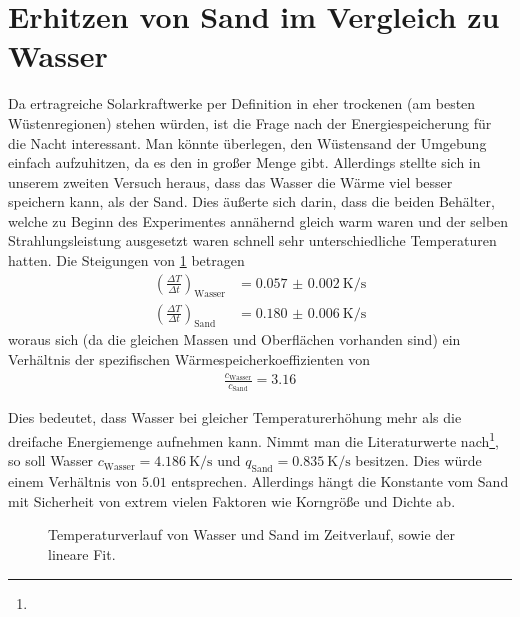 \documentclass[12pt,a4paper,titlepage,headinclude,bibtotoc]{scrartcl}
\begin{document}
\section{Erhitzen von Sand im Vergleich zu Wasser}
Da ertragreiche Solarkraftwerke per Definition in eher trockenen (am besten Wüstenregionen) stehen würden, ist die Frage nach der Energiespeicherung für die Nacht interessant.
Man könnte überlegen, den Wüstensand der Umgebung einfach aufzuhitzen, da es den in großer Menge gibt.
Allerdings stellte sich in unserem zweiten Versuch heraus, dass das Wasser die Wärme viel besser speichern kann, als der Sand.
Dies äußerte sich darin, dass die beiden Behälter, welche zu Beginn des Experimentes annähernd gleich warm waren und der selben Strahlungsleistung ausgesetzt waren schnell sehr unterschiedliche Temperaturen hatten.
Die Steigungen von \ref{fig:wassersand} betragen
\begin{align*}
	\left( \frac{\Delta T}{\Delta t} \right)_\text{Wasser}&=\SI{0.057(2)}{\kelvin \per \second}\\
	\left( \frac{\Delta T}{\Delta t} \right)_\text{Sand}&=\SI{0.180(6)}{\kelvin \per \second}
\end{align*}
woraus sich (da die gleichen Massen und Oberflächen vorhanden sind) ein Verhältnis der spezifischen Wärmespeicherkoeffizienten von
\begin{align*}
	\frac{c_\text{Wasser}}{c_\text{Sand}}=3.16
\end{align*}

Dies bedeutet, dass Wasser bei gleicher Temperaturerhöhung mehr als die dreifache Energiemenge aufnehmen kann.
Nimmt man die Literaturwerte nach\footnote{\spezWaerme}, so soll Wasser $c_\text{Wasser}=\SI{4.186}{\kelvin \per \second}$ und $q_\text{Sand}=\SI{0.835}{\kelvin \per \second}$ besitzen.
Dies würde einem Verhältnis von $5.01$ entsprechen.
Allerdings hängt die Konstante vom Sand mit Sicherheit von extrem vielen Faktoren wie Korngröße und Dichte ab.

\begin{figure}[h]
	\centering
	
	\caption{Temperaturverlauf von Wasser und Sand im Zeitverlauf, sowie der lineare Fit.}
	\label{fig:wassersand}
\end{figure}
\end{document}
